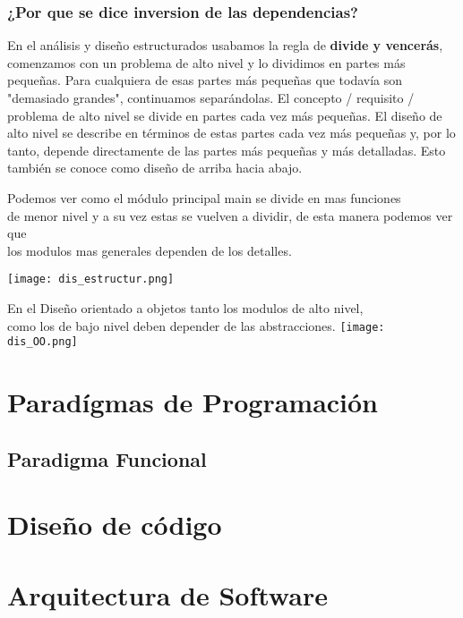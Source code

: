 \documentclass[12pt]{book}
\begin{document}
\subsection{¿Por que se dice inversion de las dependencias?}
En el análisis y diseño estructurados usabamos la regla de \textbf{divide y vencer\'as}, comenzamos con un problema de alto nivel y lo dividimos en partes más pequeñas. Para cualquiera de esas partes más pequeñas que todavía son "demasiado grandes", continuamos separándolas. El concepto / requisito / problema de alto nivel se divide en partes cada vez más pequeñas. El diseño de alto nivel se describe en términos de estas partes cada vez más pequeñas y, por lo tanto, depende directamente de las partes más pequeñas y más detalladas. Esto también se conoce como diseño de arriba hacia abajo.

\begin{center}
Podemos ver como el m\'odulo principal main se divide en mas funciones \\
de menor nivel y a su vez estas se vuelven a dividir, de esta manera podemos ver que\\
los modulos mas generales dependen de los detalles.

\texttt{[image: dis\_estructur.png]}
\end{center}

\begin{center}
En el Diseño orientado a objetos tanto los modulos de alto nivel, \\
como los de bajo nivel deben depender de las abstracciones.
\texttt{[image: dis\_OO.png]}
\end{center}



\chapter{Parad\'igmas de Programaci\'on}
\section{Paradigma Funcional}


\chapter{Diseño de código}

\chapter{Arquitectura de Software}
\end{document}
